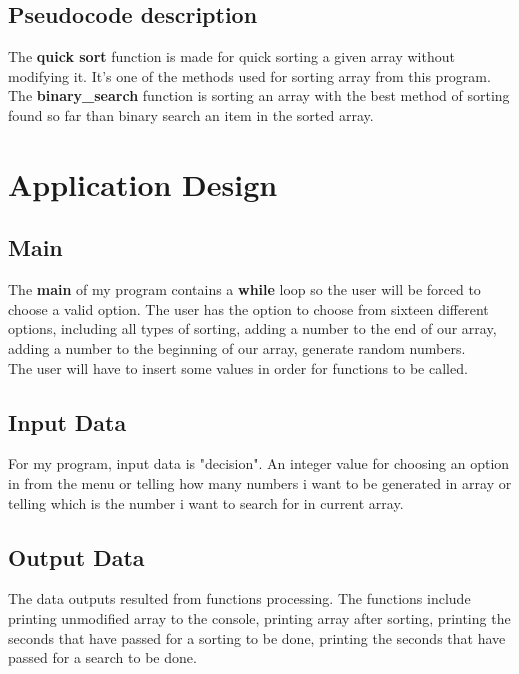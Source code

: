 \documentclass{article}
\begin{document}
\pagebreak

\subsection{Pseudocode description}
\textbf{}
\indent The {\bf quick sort} function is made for quick sorting a given array without modifying it. It's one of the methods used for sorting array from this program. \\
The {\bf binary\_search} function is sorting an array with the best method of sorting found so far than binary search an item in the sorted array. \\

\section{Application Design}
\subsection{Main}
\textbf{}
\indent The {\bf main} of my program contains a {\bf while} loop so the user will be forced to choose a valid option. The user has the option to choose from sixteen different options, including all types of sorting, adding a number to the end of our array, adding a number to the beginning of our array, generate random numbers.
\\
The user will have to insert some values in order for functions to be called.

\subsection{Input Data}
\textbf{}
\indent For my program, input data is "decision". An integer value for choosing an option in from the menu or telling how many numbers i want to be generated in array or telling which is the number i want to search for in current array.

\subsection{Output Data}
\textbf{}
\indent The data outputs resulted from functions processing. The functions include printing unmodified array to the console, printing array after sorting, printing the seconds that have passed for a sorting to be done, printing the seconds that have passed for a search to be done.




\pagebreak
\end{document}
